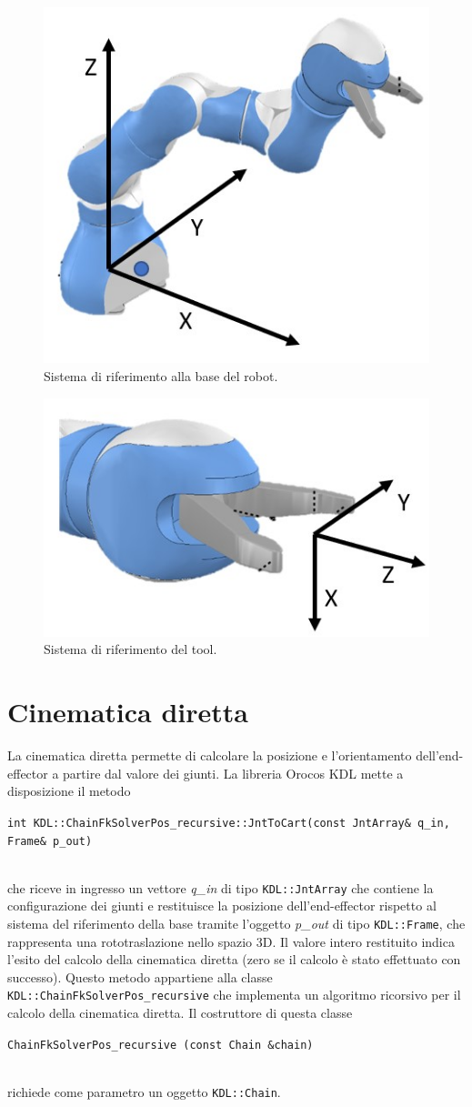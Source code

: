\begin{figure}[tbh]
	\centering
	\includegraphics[width=0.5\linewidth]{./ImageFiles/prob_frame_base}
	\caption{Sistema di riferimento alla base del robot.}
	\label{fig:base_frame}
\end{figure}

\begin{figure}[tbh]
	\centering
	\includegraphics[width=0.5\linewidth]{./ImageFiles/prob_frame_tool.jpg}
	\caption{Sistema di riferimento del tool.}
	\label{fig:tool_frame}
\end{figure}

\clearpage

\section{Cinematica diretta}
La cinematica diretta permette di calcolare la posizione e l'orientamento dell'end-effector a partire dal valore dei giunti. La libreria Orocos KDL mette a disposizione il metodo \\ \centerline{\texttt{int KDL::ChainFkSolverPos\_recursive::JntToCart(const JntArray\& q\_in, Frame\& p\_out)}} \\ che riceve in ingresso un vettore \textit{q\_in} di tipo \texttt{KDL::JntArray} che contiene la configurazione dei giunti e restituisce la posizione dell'end-effector rispetto al sistema del riferimento della base tramite l'oggetto \textit{p\_out} di tipo \texttt{KDL::Frame}, che rappresenta una rototraslazione nello spazio 3D. Il valore intero restituito indica l'esito del calcolo della cinematica diretta (zero se il calcolo è stato effettuato con successo). Questo metodo appartiene alla classe \texttt{KDL::ChainFkSolverPos\_recursive} che implementa un algoritmo ricorsivo per il calcolo della cinematica diretta. Il costruttore di questa classe \\ \centerline{\texttt{ChainFkSolverPos\_recursive (const Chain \&chain)}} \\ richiede come parametro un oggetto \texttt{KDL::Chain}.

